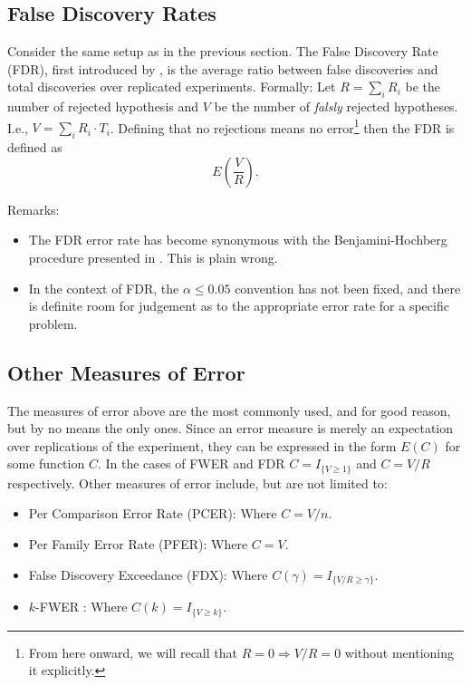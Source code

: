 \documentclass[draft,12pt]{article}
\begin{document}
\subsection{False Discovery Rates}
Consider the same setup as in the previous section. The False Discovery Rate (FDR), first introduced by \citet{benjamini_controlling_1995}, is the average ratio between false discoveries and total discoveries over replicated experiments.
Formally: Let $R=\sum_i{R_i}$ be the number of rejected hypothesis and $V$ be the number of \emph{falsly} rejected hypotheses. I.e., $V=\sum_i{R_i \cdot T_i}$. Defining that no rejections means no error\footnote{ From here onward, we will recall that $R=0 \Rightarrow V/R=0$ without mentioning it explicitly.} then the FDR is defined as $$E \left( \frac{V}{R} \right).$$

Remarks:
\begin{itemize}
\item The FDR error rate has become synonymous with the Benjamini-Hochberg procedure presented in \citet{benjamini_controlling_1995} . This is plain wrong.
\item In the context of FDR, the $\alpha \leq 0.05$ convention has not been fixed, and there is definite room for judgement as to the appropriate error rate for a specific problem.
\end{itemize}




\subsection{Other Measures of Error}
The measures of error above are the most commonly used, and for good reason, but by no means the only ones. Since an error measure is merely an expectation over replications of the experiment, they can be expressed in the form $E(C)$ for some function $C$. In the cases of FWER and FDR $C = I_{\{ V \geq 1 \} } $ and $C = V/R$ respectively.
Other measures of error include, but are not limited to:

\begin{itemize}
\item Per Comparison Error Rate (PCER): Where $C=V/n$.
\item Per Family Error Rate (PFER): Where $C=V$.
\item False Discovery Exceedance (FDX)\citep{genovese_exceedance_2006}: Where $C(\gamma) = I_{\{ V/R \geq \gamma \} }$.
\item $k$-FWER \citep{van_der_laan_augmentation_2004}: Where $C(k) = I_{\{ V \geq k \} }$.
\end{itemize}
\end{document}
